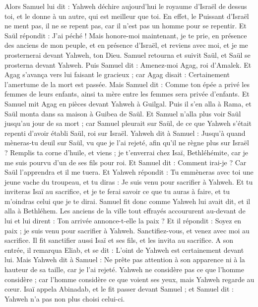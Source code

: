 \begin{multicols}{2}
Alors Samuel lui dit : Yahweh déchire aujourd'hui le royaume d'Israël de dessus toi, et le donne à un autre, qui est meilleur que toi.
En effet, le Puissant d'Israël ne ment pas, il ne se repent pas, car il n'est pas un homme pour se repentir.
Et Saül répondit : J'ai péché ! Mais honore-moi maintenant, je te prie, en présence des anciens de mon peuple, et en présence d'Israël, et reviens avec moi, et je me prosternerai devant Yahweh, ton Dieu.
Samuel retourna et suivit Saül, et Saül se prosterna devant Yahweh.
Puis Samuel dit : Amenez-moi Agag, roi d'Amalek. Et Agag s'avança vers lui faisant le gracieux ; car Agag disait : Certainement l'amertume de la mort est passée.
Mais Samuel dit : Comme ton épée a privé les femmes de leurs enfants, ainsi ta mère entre les femmes sera privée d'enfants. Et Samuel mit Agag en pièces devant Yahweh à Guilgal.
Puis il s'en alla à Rama, et Saül monta dans sa maison à Guibea de Saül.
Et Samuel n'alla plus voir Saül jusqu'au jour de sa mort ; car Samuel pleurait sur Saül, de ce que Yahweh s'était repenti d'avoir établi Saül, roi sur Israël.
\VerseOne{}Yahweh dit à Samuel : Jusqu'à quand mèneras-tu deuil sur Saül, vu que je l'ai rejeté, afin qu'il ne règne plus sur Israël ? Remplis ta corne d'huile, et viens ; je t'enverrai chez Isaï, Bethléhémite, car je me suis pourvu d'un de ses fils pour roi.
Et Samuel dit : Comment irai-je ? Car Saül l'apprendra et il me tuera. Et Yahweh répondit : Tu emmèneras avec toi une jeune vache du troupeau, et tu diras : Je suis venu pour sacrifier à Yahweh.
Et tu inviteras Isaï au sacrifice, et je te ferai savoir ce que tu auras à faire, et tu m'oindras celui que je te dirai.
Samuel fit donc comme Yahweh lui avait dit, et il alla à Bethléhem. Les anciens de la ville tout effrayés accoururent au-devant de lui et lui dirent : Ton arrivée annonce-t-elle la paix ?
Et il répondit : Soyez en paix ; je suis venu pour sacrifier à Yahweh. Sanctifiez-vous, et venez avec moi au sacrifice. Il fit sanctifier aussi Isaï et ses fils, et les invita au sacrifice.
A son entrée, il remarqua Eliab, et se dit : L'oint de Yahweh est certainement devant lui.
Mais Yahweh dit à Samuel : Ne prête pas attention à son apparence ni à la hauteur de sa taille, car je l'ai rejeté. Yahweh ne considère pas ce que l'homme considère ; car l'homme considère ce que voient ses yeux, mais Yahweh regarde au cœur.
Isaï appela Abinadab, et le fit passer devant Samuel ; et Samuel dit : Yahweh n'a pas non plus choisi celui-ci.

\end{multicols}
